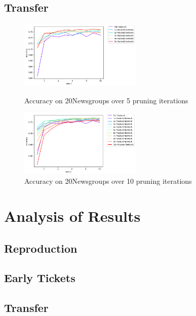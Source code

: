 \subsection*{Transfer}
\begin{figure}
	\begin{minipage}{0.5\textwidth}
		\centering
		\includegraphics[width=220px]{gfx/Experiments/Transfer-20Newsgroups-CNN/accuracy/5_iterations.png}
		\caption*{Accuracy on 20Newsgroups over 5 pruning iterations}
		\label{fig:CIFAR10accuracy10}
	\end{minipage}\hfill
	\begin{minipage}{0.5\textwidth}
		\centering
		\includegraphics[width=220px]{gfx/Experiments/Transfer-20Newsgroups-CNN/accuracy/10_iterations.png}
		\caption*{Accuracy on 20Newsgroups over 10 pruning iterations}
		\label{fig:CIFAR10accuracy15}
	\end{minipage}
\end{figure}

\section{Analysis of Results}
\subsection*{Reproduction}
\subsection*{Early Tickets}
\subsection*{Transfer}

